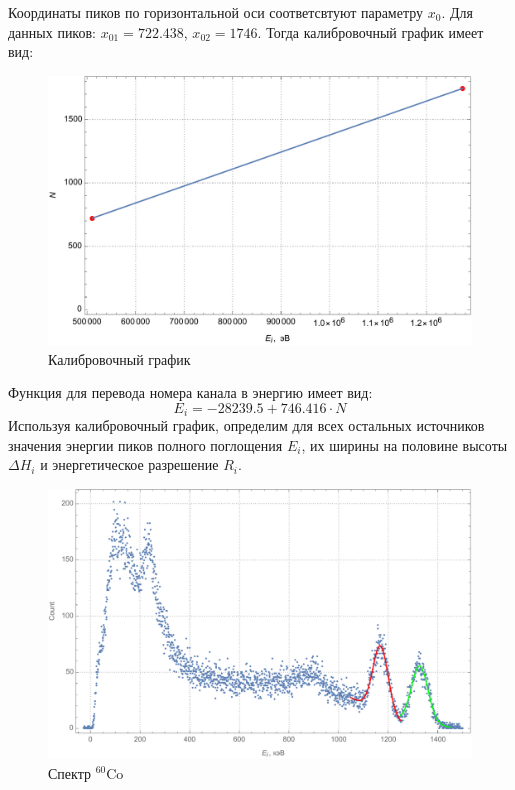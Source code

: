 \documentclass[a4paper, 12pt]{article}
\begin{document}
\par
Координаты пиков по горизонтальной оси соответсвтуют параметру $x_0$. Для данных пиков: $x_{01}=722.438$, $x_{02}=1746$. Тогда калибровочный график имеет вид:
\begin{figure}[!htb]
\centering
\includegraphics[scale=0.7]{calibrator.pdf}
\caption{Калибровочный график}
\end{figure}
\par
Функция для перевода номера канала в энергию имеет вид:
\begin{equation}
E_i=-28239.5 + 746.416\cdot N
\end{equation}
Используя калибровочный график, определим для всех остальных источников значения энергии пиков полного поглощения $E_i$, их ширины на половине высоты $\Delta H_i$ и энергетическое разрешение $R_i$.
\begin{figure}[!htb]
\centering
\includegraphics[scale=0.73]{co60.pdf}
\caption{Спектр $^{60}\text{Co}$}
\end{figure}
\end{document}
